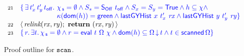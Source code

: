 \begin{figure}[!htp]
\[\begin{array}[t]{r l}
   \num{21} & \specK{\{\, \exists\, t'_x\, t'_y\, \toff \ldot\,
              \histS = \hempty \wedge
              \sss = \sOff\ \toff \wedge \sx = \sy = \TT \wedge
              h \subseteq \hist \wedge}\\
             & \specK{\hphantom{\{\,
                  \exists\, t'_x\, t'_y\, \toff \ldot}\,
              \C(\dom{h}) = \mathsf{green} \wedge
              \histLGY\ x\ t'_x\ \var{rx} \wedge
              \histLGY\ y\ t'_y\ \var{ry}\}}\\
  \num{22} & \lat\,\aux{relink}(\var{rx}, \var{ry});\
                \kw{return}\ (\var{rx}, \var{ry})\,\rat \\
  \num{23} & \specK{\{\, r\ldot \exists t\ldot \histS = \hempty \wedge
    r = \eval\ t\ {\stableorder}\ {\hist} \wedge
    \dom{h} \subseteq \ideal{\stableorder}{t} \wedge
    t \in \scanned{\stableorder}\}}
\end{array}
\]
  \caption{\label{proof:scan} Proof outline for $\texttt{scan}$.}
\end{figure}
